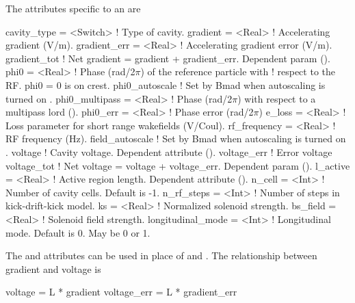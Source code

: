 The attributes specific to an  are 
\begin{example}
  cavity_type     = <Switch>  ! Type of cavity.
  gradient        = <Real>    ! Accelerating gradient (V/m).
  gradient_err    = <Real>    ! Accelerating gradient error (V/m).
  gradient_tot                ! Net gradient = gradient + gradient_err. Dependent param ().
  phi0            = <Real>    ! Phase (rad/2\(\pi\)) of the reference particle with 
                              !   respect to the RF. phi0 = 0 is on crest.
  phi0_autoscale              ! Set by Bmad when autoscaling is turned on .
  phi0_multipass  = <Real>    ! Phase (rad/2\(\pi\)) with respect to a multipass lord ().
  phi0_err        = <Real>    ! Phase error (rad/2\(\pi\))
  e_loss          = <Real>    ! Loss parameter for short range wakefields (V/Coul).
  rf_frequency    = <Real>    ! RF frequency (Hz).
  field_autoscale             ! Set by Bmad when autoscaling is turned on .
  voltage                     ! Cavity voltage. Dependent attribute ().
  voltage_err                 ! Error voltage
  voltage_tot                 ! Net voltage = voltage + voltage_err. Dependent param ().
  l_active        = <Real>    ! Active region length. Dependent attribute ().
  n_cell          = <Int>     ! Number of cavity cells. Default is -1.
  n_rf_steps      = <Int>     ! Number of steps in kick-drift-kick model.
  ks              = <Real>    ! Normalized solenoid strength.
  bs_field        = <Real>    ! Solenoid field strength.
  longitudinal_mode = <Int>   ! Longitudinal mode. Default is 0. May be 0 or 1.
\end{example}


The  and  attributes can be used in place of  and .
The relationship between gradient and voltage is
\begin{example}
  voltage     = L * gradient
  voltage_err = L * gradient_err
\end{example}

